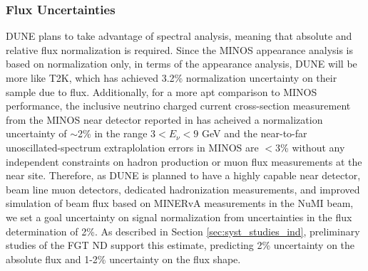 \subsubsection{Flux Uncertainties}
\label{sec:syst_just_flux}
DUNE plans to take advantage of spectral analysis,
meaning that absolute and relative flux normalization is required. Since the MINOS \nue appearance analysis
is based on normalization only, in terms of the \nue appearance analysis, DUNE will be more like T2K,
which has achieved 3.2\% normalization uncertainty on their \nue sample due to flux. Additionally, for a more apt
comparison to MINOS performance, the inclusive neutrino charged current cross-section measurement from the MINOS
near detector reported in \cite{xxx} has acheived a normalization uncertainty of $\sim$2\% in the
range $3 < E_\nu < 9$ GeV and the near-to-far \numu unoscillated-spectrum extraplolation errors in MINOS
are $<$3\% without any independent constraints on hadron production or muon flux measurements at the near
site. Therefore, as DUNE is planned to have a highly capable near detector, beam line
muon detectors, dedicated hadronization measurements, and improved simulation of beam flux based on MINERvA
measurements in the NuMI beam, we set a goal uncertainty on \nue signal
normalization from uncertainties in the flux determination of 2\%.
As described in Section \ref{sec:syst_studies_ind}, preliminary
studies of the FGT ND support this estimate, predicting 2\% uncertainty on the absolute flux and 1-2\%
uncertainty on the flux shape.
